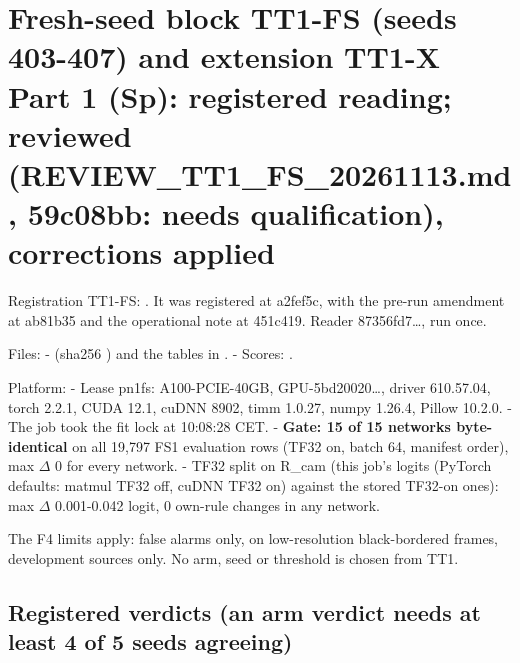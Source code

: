 \documentclass[10pt,twocolumn,letterpaper]{article}
\begin{document}
\section{Fresh-seed block TT1-FS (seeds 403-407) and extension TT1-X Part 1 (Sp): registered reading; reviewed (REVIEW\_TT1\_FS\_20261113.md, 59c08bb: needs qualification), corrections applied}\label{fresh-seed-block-tt1-fs-seeds-403-407-and-extension-tt1-x-part-1-sp-registered-reading-reviewed-review_tt1_fs_20261113.md-59c08bb-needs-qualification-corrections-applied}

Registration TT1-FS: \protect{}. It was registered at a2fef5c, with the pre-run amendment at ab81b35 and the operational note at 451c419. Reader \protect{} 87356fd7\ldots{}, run once.

Files: - \protect{} (sha256 \protect{}) and the tables in \protect{}. - Scores: \protect{}.

Platform: - Lease pn1fs: A100-PCIE-40GB, GPU-5bd20020\ldots{}, driver 610.57.04, torch 2.2.1, CUDA 12.1, cuDNN 8902, timm 1.0.27, numpy 1.26.4, Pillow 10.2.0. - The job took the fit lock at 10:08:28 CET. - \textbf{Gate: 15 of 15 networks byte-identical} on all 19,797 FS1 evaluation rows (TF32 on, batch 64, manifest order), max \textbar{}\(\Delta\)\textbar{} 0 for every network. - TF32 split on R\_cam (this job's logits (PyTorch defaults: matmul TF32 off, cuDNN TF32 on) against the stored TF32-on ones): max \textbar{}\(\Delta\)\textbar{} 0.001-0.042 logit, 0 own-rule changes in any network.

The F4 limits apply: false alarms only, on low-resolution black-bordered frames, development sources only. No arm, seed or threshold is chosen from TT1.

\subsection{Registered verdicts (an arm verdict needs at least 4 of 5 seeds agreeing)}\label{registered-verdicts-an-arm-verdict-needs-at-least-4-of-5-seeds-agreeing}
\end{document}
